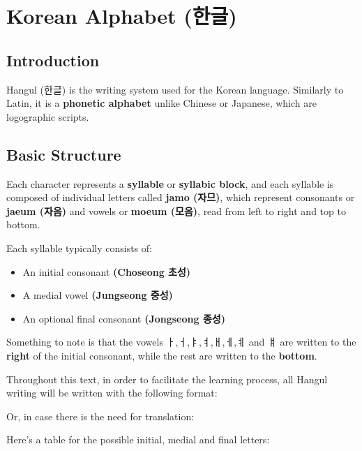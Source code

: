 \section{Korean Alphabet (한글)}
\subsection{Introduction}
Hangul (한글) is the writing system used for the Korean language. Similarly to Latin, it is a \textbf{phonetic alphabet} unlike Chinese or Japanese, which are logographic scripts. 

\subsection{Basic Structure}
Each character represents a \textbf{syllable} or \textbf{syllabic block}, and each syllable is composed of individual letters called \textbf{jamo (자므)}, which represent consonants or \textbf{jaeum (자음)} and vowels or \textbf{moeum (모음)}, read from left to right and top to bottom.

Each syllable typically consists of:

\begin{itemize}
    \item An initial consonant \textbf{(Choseong 초성)}
    \item A medial vowel \textbf{(Jungseong 중성)}
    \item An optional final consonant \textbf{(Jongseong 종성)}
\end{itemize}

Something to note is that the vowels ㅏ,ㅓ,ㅑ,ㅕ,ㅐ,ㅔ,ㅖ and ㅒ are written to the \textbf{right} of the initial consonant, while the rest are written to the \textbf{bottom}.

Throughout this text, in order to facilitate the learning process, all Hangul writing will be written with the following format:

\begin{center}
\end{center}

Or, in case there is the need for translation:

\begin{center}
\end{center}

\newpage
Here's a table for the possible initial, medial and final letters: 

